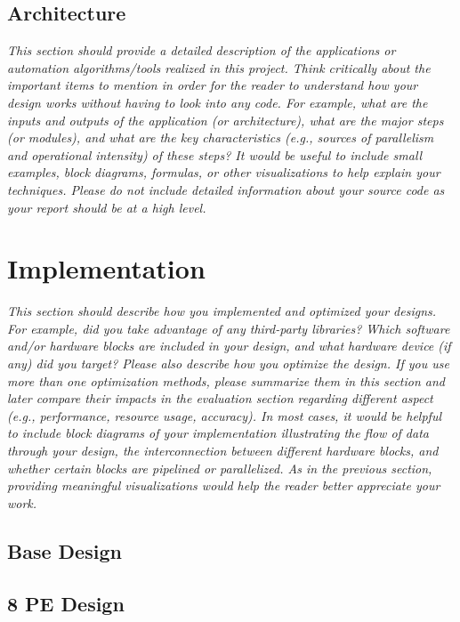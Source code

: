 \documentclass[10pt]{article}
\begin{document}
\subsection{Architecture}

\textit{This section should provide a detailed description of the applications or
automation algorithms/tools realized in this project. Think critically about the important items to
mention in order for the reader to understand how your design works without having to look into any
code. For example, what are the inputs and outputs of the application (or architecture), what are the
major steps (or modules), and what are the key characteristics (e.g., sources of parallelism and operational intensity) of these steps? It would be useful to include small examples, block diagrams, formulas,
or other visualizations to help explain your techniques. Please do not include detailed information
about your source code as your report should be at a high level.}


\section{Implementation}
\textit{This section should describe how you implemented and optimized your designs. For
example, did you take advantage of any third-party libraries? Which software and/or hardware blocks
are included in your design, and what hardware device (if any) did you target? Please also describe
how you optimize the design. If you use more than one optimization methods, please summarize them
in this section and later compare their impacts in the evaluation section regarding different aspect (e.g.,
performance, resource usage, accuracy). In most cases, it would be helpful to include block diagrams
of your implementation illustrating the flow of data through your design, the interconnection between
different hardware blocks, and whether certain blocks are pipelined or parallelized. As in the previous
section, providing meaningful visualizations would help the reader better appreciate your work.}

\subsection{Base Design}


\subsection{8 PE Design}
\end{document}
